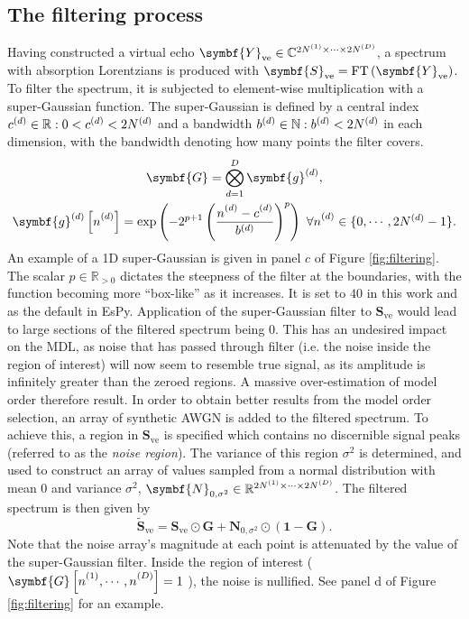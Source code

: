 \subsection{The filtering process}
Having constructed a virtual echo $\symbf{Y}_{\text{ve}} \in \mathbb{C}^{2\None
\times \cdots \times 2\ND}$, a spectrum with absorption Lorentzians is produced
with $\symbf{S}_{\text{ve}} = \FT\left(\symbf{Y}_{\text{ve}}\right)$. To filter
the spectrum, it is subjected to element-wise multiplication with a
super-Gaussian function. The super-Gaussian is defined by a central index
$c^{(d)} \in \mathbb{R}: 0 < c^{(d)} < 2 N^{(d)}$ and a bandwidth  $b^{(d)} \in
\mathbb{N}: b^{(d)} < 2N^{(d)}$ in each dimension, with the bandwidth denoting how
many points the filter covers.
\begin{subequations}
    \begin{gather}
        \symbf{G} = \bigotimes_{d=1}^D
            \symbf{g}^{(d)}, \\
        \symbf{g}_{\vphantom{t}}^{(d)}\left[ \nd \right] = \exp \left(
            -2^{p+1} \left(
                \frac{\nd - c^{(d)}_{\vphantom{t}}}{b^{(d)}}
            \right)^p
        \right)\ \forall \nd \in \lbrace 0, \cdots, 2 \Nd - 1 \rbrace.
        \label{eq:super-Gaussian-onedim}
    \end{gather}
\end{subequations}
An example of a \ac{1D} super-Gaussian is given in panel $c$ of Figure
\ref{fig:filtering}. The scalar $p \in \mathbb{R}_{>0}$ dictates the steepness
of the filter at the boundaries, with the function becoming more ``box-like''
as it increases. It is set to $40$ in this work and as the default in
\ac{EsPy}. Application of the super-Gaussian filter to $\symbf{S}_{\text{ve}}$
would lead to large sections of the filtered spectrum being $0$. This has an
undesired impact on the \ac{MDL}, as noise that has passed through filter (i.e.
the noise inside the region of interest) will now seem to resemble true signal,
as its amplitude is infinitely greater than the zeroed regions. A massive
over-estimation of model order therefore result. In order to obtain better
results from the model order selection, an array of synthetic \ac{AWGN} is
added to the filtered spectrum. To achieve this, a region in
$\symbf{S}_{\text{ve}}$ is specified which contains no discernible signal peaks
(referred to as the \emph{noise region}). The variance of this region
$\sigma^2$ is determined, and used to construct an array of values sampled from
a normal distribution with mean $0$ and variance $\sigma^2$,
$\symbf{N}_{0,\sigma^2} \in \mathbb{R}^{2 \None \times \cdots \times 2 \ND}$.
The filtered spectrum is then given by
\begin{equation}
    \widetilde{\symbf{S}}_{\text{ve}} = \symbf{S}_{\text{ve}} \odot \symbf{G} + \symbf{N}_{0,\sigma^2} \odot \left(\symbf{1} - \symbf{G} \right).
    \label{eq:Sve-tilde}
\end{equation}
Note that the noise array's magnitude at each point is attenuated by the value
of the super-Gaussian filter. Inside the region of interest ($\symbf{G}\left[
\none, \cdots, \nD \right] = 1$ ), the noise is nullified. See panel d of
Figure \ref{fig:filtering} for an example.

